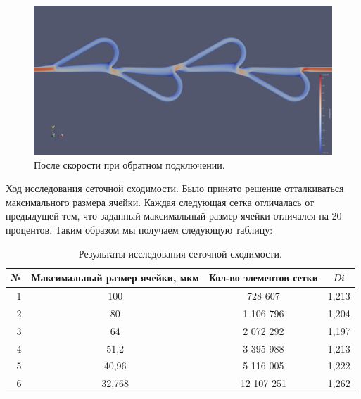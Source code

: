 \documentclass[14pt,a4paper]{article}
\begin{document}
        \begin{figure}[H]
            \centering
            \includegraphics[width = 1\linewidth]{UFieldsReverse}
            \caption{После скорости при обратном подключении.}
            \label{fig:UFieldsReverse}
        \end{figure}
            
        Ход исследования сеточной сходимости. Было принято решение отталкиваться максимального размера ячейки. Каждая следующая сетка отличалась от предыдущей тем, что заданный максимальный размер ячейки отличался на 20 процентов. Таким образом мы получаем следующую таблицу: 
        \\
        \begin{table}[!htb]
            \begin{center}
                \caption{Результаты исследования сеточной сходимости.}
                \begin{tabular}{rccc}                 
                    \hline
                    №      & Максимальный размер ячейки, мкм & Кол-во элементов сетки  & $Di$ \\
                    \hline
                    \hline
                    1	& 100		& 728 607		& 1,213		\\
                    2	& 80		& 1 106 796	 	& 1,204		\\
                    3   & 64		& 2 072 292		& 1,197		\\
                    4	& 51,2		& 3 395 988		& 1,213		\\
                    5	& 40,96		& 5 116 005		& 1,222		\\
                    6	& 32,768	& 12 107 251	& 1,262		\\
                    \hline                   
                \end{tabular}
                \label{tab:tab1} 
            \end{center}
        \end{table}
        \\
        
\end{document}

